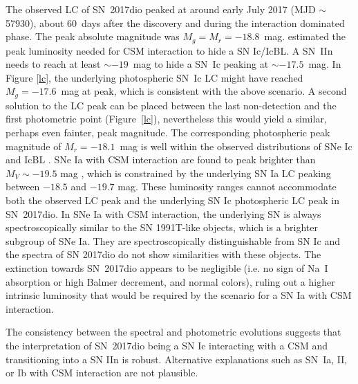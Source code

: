 \documentclass[twocolumn]{aastex61}
\begin{document}
The observed LC of SN~2017dio peaked at around early July 2017 {(MJD $\sim$ 57930)}, about 60~days after the discovery {and during the interaction dominated phase}. 
{The peak absolute magnitude was $M_g = M_r = -18.8$~mag}. 
\citet{leloudas15} estimated the peak luminosity needed for CSM interaction to hide a SN Ic/IcBL. A SN~IIn needs to {reach} at least $\sim -19$~mag to hide a SN~Ic peaking at $\sim -17.5$~mag.
{In Figure \ref{lc}, the underlying photospheric SN~Ic LC might have reached $M_g = -17.6$~mag at peak, which is consistent with the above scenario.}
A second solution to the LC peak can be placed between the last non-detection and the first photometric point (Figure~\ref{lc}), nevertheless this would yield a similar, perhaps even fainter, peak magnitude.
{The corresponding {photospheric} peak magnitude of $M_r = -18.1$~mag is well within the observed distributions of SNe Ic and IcBL \citep[$M_R = -18.5 \pm 0.8$ mag and $M_R = -19.0 \pm 1.1$ mag, respectively;][]{drout11}.}
SNe Ia with CSM interaction are  found to peak brighter than $M_V \sim -19.5$ mag \citep{leloudas15,silverman13}, which is constrained by the underlying SN Ia LC peaking between $-18.5$ and $-19.7$ mag. These luminosity ranges cannot accommodate both the observed LC peak and the underlying SN Ic {photospheric} LC peak in SN~2017dio. 
{In SNe Ia with CSM interaction, the underlying SN is always spectroscopically similar to the SN 1991T-like objects, which is a brighter subgroup of SNe Ia.
They are spectroscopically distinguishable from SN Ic \citep[e.g.][]{leloudas15} and the spectra of SN 2017dio do not show similarities with these objects.}
The extinction towards SN~2017dio appears to be negligible (i.e. no sign of Na~I absorption or high Balmer decrement, and normal colors), ruling out a higher intrinsic luminosity that would be required by the scenario for a SN Ia with CSM interaction.
 

The consistency between the spectral and photometric evolutions suggests that the interpretation of SN~2017dio being a SN Ic interacting with a CSM and transitioning into a SN IIn is robust.
{Alternative explanations such as SN~Ia, II, or Ib with CSM interaction are not plausible.}

\end{document}
